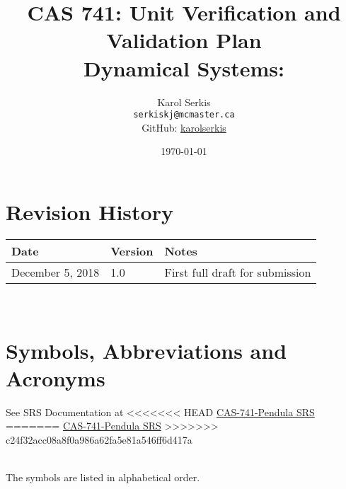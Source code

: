 \documentclass[12pt, titlepage]{article}
\begin{document}
\title{CAS 741: Unit Verification and Validation Plan\\[10pt]\Large Dynamical 
Systems: \progname}
\author{Karol Serkis\\\texttt{serkiskj@mcmaster.ca}\\GitHub:
\href{https://www.github.com/karolserkis}{karolserkis}}
\date{\today}
	
\maketitle


\section{Revision History}

\begin{tabularx}{\textwidth}{p{4cm}p{2cm}X}
\toprule {\bf Date} & {\bf Version} & {\bf Notes}\\
\midrule
December 5, 2018 & 1.0 &  First full draft for submission\\
\bottomrule
\end{tabularx}

~\newpage

\section{Symbols, Abbreviations and Acronyms}

See SRS Documentation at 
<<<<<<< HEAD
\href{https://github.com/karolserkis/CAS-741-Pendula
/blob/master/docs/SRS/SRS.pdf}{CAS-741-Pendula SRS}
=======
\href{https://github.com/karolserkis/CAS-741-Pendula/blob/master/docs/SRS/SRS.pdf}{CAS-741-Pendula SRS}
 
>>>>>>> c24f32acc08a8f0a986a62fa5e81a546ff6d417a

\\
The symbols are listed in alphabetical order.\\
\end{document}
